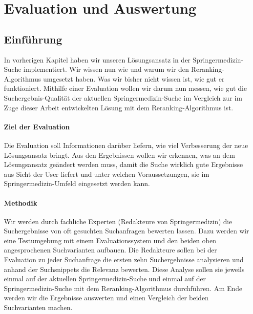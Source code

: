 %
\chapter{Evaluation und Auswertung}
\label{sec:Evaluation}

\section{Einführung}
\label{sec:Evaluation:Einfuehrung}

In vorherigen Kapitel haben wir unseren Lösungsansatz in der Springermedizin-Suche implementiert. Wir wissen nun wie und warum wir den Reranking-Algorithmus umgesetzt haben. Was wir bisher nicht wissen ist, wie gut er funktioniert. Mithilfe einer Evaluation wollen wir darum nun messen, wie gut die Suchergebnis-Qualität der aktuellen Springermedizin-Suche im Vergleich zur im Zuge dieser Arbeit entwickelten Lösung mit dem Reranking-Algorithmus ist. 

\subsubsection{Ziel der Evaluation}
\label{sec:Evaluation:Einfuehrung:Ziel}

Die Evaluation soll Informationen darüber liefern, wie viel Verbesserung der neue Lösungsansatz bringt. Aus den Ergebnissen wollen wir erkennen, was an dem Lösungsansatz geändert werden muss, damit die Suche wirklich gute Ergebnisse aus Sicht der User liefert und unter welchen Voraussetzungen, sie im Springermedizin-Umfeld eingesetzt werden kann.

\subsubsection{Methodik}
\label{sec:Evaluation:Einfuehrung:Methodik}
Wir werden durch fachliche Experten (Redakteure von Springermedizin) die Suchergebnisse von oft gesuchten Suchanfragen bewerten lassen. Dazu werden wir eine Testumgebung mit einem Evaluationssystem und den beiden oben angesprochenen Suchvarianten aufbauen. Die Redakteure sollen bei der Evaluation zu jeder Suchanfrage die ersten zehn Suchergebnisse analysieren und anhand der Suchsnippets die Relevanz bewerten. Diese Analyse sollen sie jeweils einmal auf der aktuellen Springermedizin-Suche und einmal auf der Springermedizin-Suche mit dem Reranking-Algorithmus durchführen. Am Ende werden wir die Ergebnisse auswerten und einen Vergleich der beiden Suchvarianten machen. 

